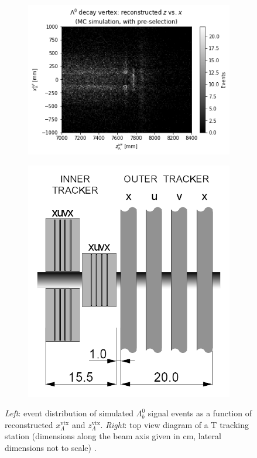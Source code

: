 \begin{figure}[t]
	\centering
	\begin{subfigure}{.45\textwidth}
		\includegraphics[width=\textwidth]{graphics/04-event_selection/Lambda_endvertex_z_vs_x.png}
		\caption{}
	\end{subfigure}
	\begin{subfigure}{.45\textwidth}
		\includegraphics[width=\textwidth]{graphics/04-event_selection/t_station_top_view.png}
		\caption{}
	\end{subfigure}
	\caption[A and b.]{\textit{Left}: event distribution of simulated $\Lambda_b^0$ signal events as a function of reconstructed $x_\Lambda^\text{vtx}$ and $z_\Lambda^\text{vtx}$. \textit{Right}: top view diagram of a T tracking station (dimensions along the beam axis given in \si{\centi\meter}, lateral dimensions not to scale) \cite{Barbosa-Marinho:582793}.}
\end{figure}


